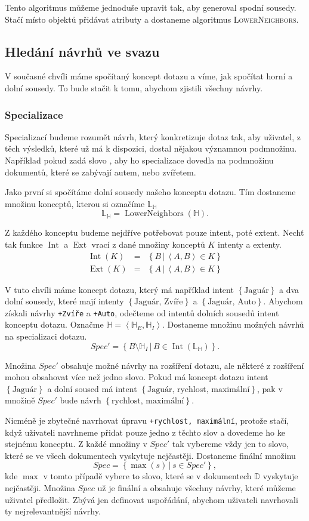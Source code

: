 \documentclass[12pt]{article}
\newcommand{\code}[1]{\texttt{#1}}
\newcommand{\sep}{\,|\,}
\newcommand{\ssection}[1]{\subsection{#1}}
\newcommand{\sssection}[1]{\subsubsection{#1}}
\newcommand{\adds}[1]{\left\{#1\right\}}
\newcommand{\addsp}[1]{\left<#1\right>}
\DeclareMathOperator{\ext}{Ext}
\DeclareMathOperator{\intfca}{Int}
\DeclareMathOperator{\lowerneighbors}{LowerNeighbors}
\newcommand{\alldoc}{\mathbb{D}}
\newcommand{\hledany}{\mathbb{H}}
\newcommand{\lowerc}{\mathbb{L}}
\begin{document}
Tento algoritmus můžeme jednoduše upravit tak, aby generoval spodní sousedy. Stačí místo objektů přidávat atributy a dostaneme algoritmus \textsc{LowerNeighbors}.

\ssection{Hledání návrhů ve svazu}

V současné chvíli máme spočítaný koncept dotazu a víme, jak spočítat horní a dolní sousedy. To bude stačit k tomu, abychom zjistili všechny návrhy. 

\sssection{Specializace}
Specializací budeme rozumět návrh, který konkretizuje dotaz tak, aby uživatel, z těch výsledků, které už má k dispozici, dostal nějakou významnou podmnožinu. Například pokud zadá slovo , aby ho specializace dovedla na podmnožinu dokumentů, které se zabývají autem, nebo zvířetem. 

Jako první si spočítáme dolní sousedy našeho konceptu dotazu. Tím dostaneme množinu konceptů, kterou si označíme $\lowerc_\hledany$
$$
\lowerc_\hledany=\lowerneighbors(\hledany).
$$

Z každého konceptu budeme nejdříve potřebovat pouze intent, poté extent. Nechť tak funkce $\intfca$ a $\ext$ vrací z dané množiny konceptů $K$ intenty a extenty.
\begin{eqnarray}
\intfca(K)&=&\adds{B\sep \addsp{A, B} \in K}\\
\ext(K)&=&\adds{A\sep \addsp{A, B} \in K}
\end{eqnarray}

V tuto chvíli máme koncept dotazu, který má například intent $\adds{\mbox{Jaguár}}$ a dva dolní sousedy, které mají intenty $\adds{\mbox{Jaguár, Zvíře}}$ a $\adds{\mbox{Jaguár, Auto}}$. Abychom získali návrhy \code{+Zvíře} a \code{+Auto}, odečteme od intentů dolních sousedů intent konceptu dotazu. Označme $\hledany=\addsp{\hledany_E, \hledany_I}$. Dostaneme množinu možných návrhů na specializaci dotazu. 
$$
Spec'=\adds{B\setminus\hledany_I\sep B \in \intfca(\lowerc_\hledany)}. 
$$

Množina $Spec'$ obsahuje možné návrhy na rozšíření dotazu, ale některé z rozšíření mohou obsahovat více než jedno slovo. Pokud má koncept dotazu intent $\adds{\mbox{Jaguár}}$ a dolní soused má intent $\adds{\mbox{Jaguár, rychlost, maximální}}$, pak v množině $Spec'$ bude návrh $\adds{\mbox{rychlost, maximální}}$. 

Nicméně je zbytečné navrhovat úpravu \code{+rychlost, maximální}, protože stačí, když uživateli navrhneme přidat pouze jedno z těchto slov a dovedeme ho ke stejnému konceptu. Z každé množiny v $Spec'$ tak vybereme vždy jen to slovo, které se ve všech dokumentech vyskytuje nejčastěji. Dostaneme finální množinu
$$
Spec=\adds{\max(s)\sep s\in Spec'},
$$
kde $\max$ v tomto případě vybere to slovo, které se v dokumentech $\alldoc$ vyskytuje nejčastěji. Množina $Spec$ už je finální a obsahuje všechny návrhy, které můžeme uživatel předložit. Zbývá jen definovat uspořádání, abychom uživateli navrhovali ty nejrelevantnější návrhy. 
\end{document}
